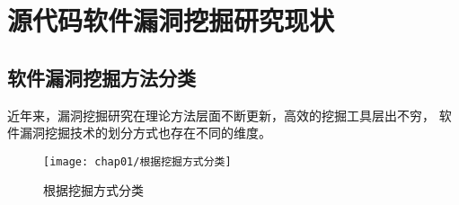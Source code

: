 

\section{源代码软件漏洞挖掘研究现状}

\subsection{软件漏洞挖掘方法分类}
近年来，漏洞挖掘研究在理论方法层面不断更新，高效的挖掘工具层出不穷，
软件漏洞挖掘技术的划分方式也存在不同的维度。 %

\begin{figure}[htb]
\begin{center}
\texttt{[image: chap01/根据挖掘方式分类]}
\end{center}
\caption{根据挖掘方式分类}
\label{根据挖掘方式分类}
\end{figure}


